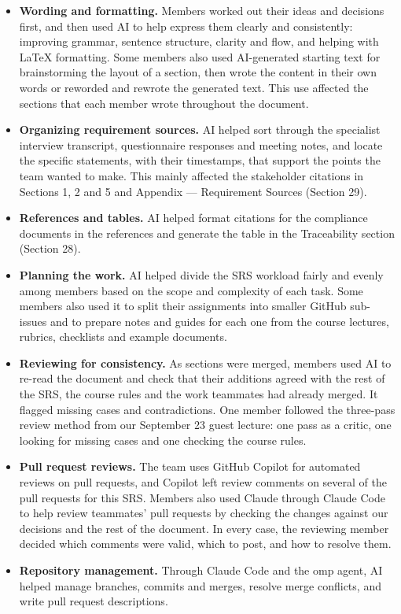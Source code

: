 \documentclass[12pt]{article}
\renewcommand{\_}{\textunderscore\allowbreak}%
\begin{document}
\begin{itemize}
  \item \textbf{Wording and formatting.} Members worked out their ideas and
  decisions first, and then used AI to help express them clearly and
  consistently: improving grammar, sentence structure, clarity and flow,
  and helping with \LaTeX{} formatting. Some members also used AI-generated
  starting text for brainstorming the layout of a section, then wrote the
  content in their own words or reworded and rewrote the generated text.
  This use affected the sections that each member wrote throughout the
  document.

  \item \textbf{Organizing requirement sources.} AI helped sort through the
  specialist interview transcript, questionnaire responses and meeting notes,
  and locate the specific statements, with their timestamps, that support
  the points the team wanted to make. This mainly affected the stakeholder
  citations in Sections 1, 2 and 5 and Appendix --- Requirement Sources
  (Section 29).

  \item \textbf{References and tables.} AI helped format citations for the
  compliance documents in the references and generate the table in the
  Traceability section (Section 28).

  \item \textbf{Planning the work.} AI helped divide the SRS workload fairly
  and evenly among members based on the scope and complexity of each task.
  Some members also used it to split their assignments into smaller GitHub
  sub-issues and to prepare notes and guides for each one from the course
  lectures, rubrics, checklists and example documents.

  \item \textbf{Reviewing for consistency.} As sections were merged, members
  used AI to re-read the document and check that their additions agreed with
  the rest of the SRS, the course rules and the work teammates had already
  merged. It flagged missing cases and contradictions. One member followed
  the three-pass review method from our September 23 guest lecture: one pass
  as a critic, one looking for missing cases and one checking the course
  rules.

  \item \textbf{Pull request reviews.} The team uses GitHub Copilot for
  automated reviews on pull requests, and Copilot left review comments on
  several of the pull requests for this SRS. Members also used Claude
  through Claude Code to help review teammates' pull requests by checking
  the changes against our decisions and the rest of the document. In every
  case, the reviewing member decided which comments were valid, which to
  post, and how to resolve them.

  \item \textbf{Repository management.} Through Claude Code and the omp
  agent, AI helped manage branches, commits and merges, resolve merge
  conflicts, and write pull request descriptions.
\end{itemize}
\end{document}
